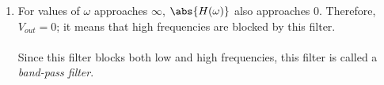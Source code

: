 \begin{enumerate}
{\begin{enumerate}
  \item For values of $\omega$ approaches $\infty$, $\abs{H(\omega)}$ also approaches $0$.
    Therefore, $V_{out} = 0$; it means that high frequencies are blocked by this filter.
    \\
    \\
    Since this filter blocks both low and high frequencies, this filter is called a \emph{band-pass filter}.

\end{enumerate}

}



\end{enumerate}

